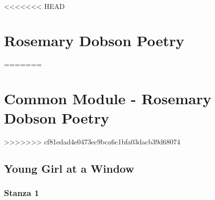 
<<<<<<< HEAD
\chapter{Rosemary Dobson Poetry}
=======
\chapter{Common Module - Rosemary Dobson Poetry}
>>>>>>> cf81edad4e0473ec9bca6c1bfa03dacb39d68074

\section{Young Girl at a Window} \label{1/11/2024}
	\subsection{Stanza 1}
